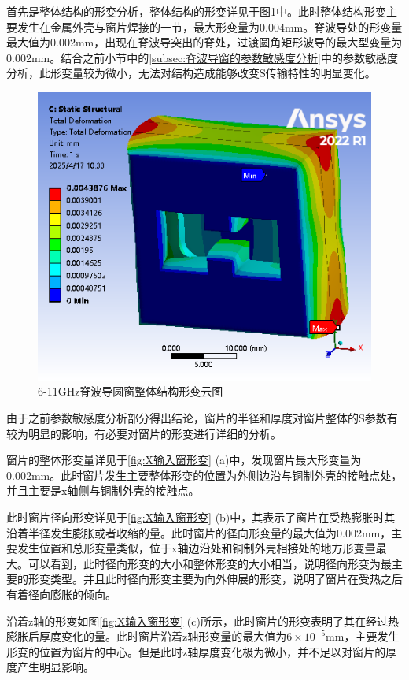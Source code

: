 \documentclass[master]{thesis-uestc}
\begin{document}
首先是整体结构的形变分析，整体结构的形变详见于图\ref{fig:X整体结构形变}中。此时整体结构形变主要发生在金属外壳与窗片焊接的一节，最大形变量为0.004mm。脊波导处的形变量最大值为0.002mm，出现在脊波导突出的脊处，过渡圆角矩形波导的最大型变量为0.002mm。结合之前小节中的\ref{subsec:脊波导窗的参数敏感度分析}中的参数敏感度分析，此形变量较为微小，无法对结构造成能够改变S传输特性的明显变化。
\begin{figure}[!htb]
    \centering
    \includegraphics[width=0.5\linewidth]{pic/chapter3/X输入窗与波导.png}
    \caption{6-11GHz脊波导圆窗整体结构形变云图}
    \label{fig:X整体结构形变}
\end{figure}

由于之前参数敏感度分析部分得出结论，窗片的半径和厚度对窗片整体的S参数有较为明显的影响，有必要对窗片的形变进行详细的分析。

窗片的整体形变量详见于\ref{fig:X输入窗形变} (a)中，发现窗片最大形变量为0.002mm。此时窗片发生主要整体形变的位置为外侧边沿与铜制外壳的接触点处，并且主要是x轴侧与铜制外壳的接触点。

此时窗片径向形变详见于\ref{fig:X输入窗形变} (b)中，其表示了窗片在受热膨胀时其沿着半径发生膨胀或者收缩的量。此时窗片的径向形变量的最大值为0.002mm，主要发生位置和总形变量类似，位于x轴边沿处和铜制外壳相接处的地方形变量最大。可以看到，此时径向形变的大小和整体形变的大小相当，说明径向形变为最主要的形变类型。并且此时径向形变主要为向外伸展的形变，说明了窗片在受热之后有着径向膨胀的倾向。

沿着z轴的形变如图\ref{fig:X输入窗形变} (c)所示，此时窗片的形变表明了其在经过热膨胀后厚度变化的量。此时窗片沿着z轴形变量的最大值为\(6 \times 10^{-5}\)mm，主要发生形变的位置为窗片的中心。但是此时z轴厚度变化极为微小，并不足以对窗片的厚度产生明显影响。
\end{document}
